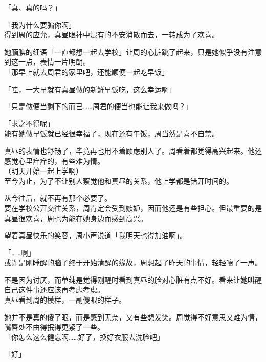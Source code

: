 「真、真的吗？」

「我为什么要骗你啊」\\

得到周的应允，真昼眼神中混有的不安消散而去，一转成为了欢喜。

她腼腆的细语「一直都想一起去学校」让周的心脏跳了起来，只是她似乎没有注意到这一点，表情一片明朗。\\

「那早上就去周君的家里吧，还能顺便一起吃早饭」

「哇，一大早就有真昼做的新鲜早饭吃，这么幸运啊」

「只是做便当剩下的而已……周君的便当也能让我来做吗？」

「求之不得呢」\\

能有她做早饭就已经很幸福了，现在还有午饭，周当然是喜不自禁。

真昼的表情也舒畅了，毕竟再也用不着顾虑别人了。周看着都觉得高兴起来。他还感觉心里痒痒的，有些难为情。\\

（明天开始一起上学啊）\\

至今为止，为了不让别人察觉他和真昼的关系，他上学都是错开时间的。

从今往后，就不再有那个必要了。\\

要在学校公开交往关系，周肯定会受到嫉妒，因而他还是有些担心。但最重要的是真昼很欢喜，周也为能在她身边而感到高兴。

望着真昼快乐的笑容，周小声说道「我明天也得加油啊」。\\

\vspace{2\baselineskip}

「……啊」\\

或许是刚睡醒的脑子终于开始清醒的缘故，周想起了昨天的事情，轻轻嚷了一声。

不是因为讨厌，而单纯是觉得刚醒时看到真昼的脸对心脏有点不好。看来让她叫醒自己这件事还应该再考虑考虑。\\

真昼看到周的模样，一副傻眼的样子。

她并不是真的傻了眼，而是感到无奈，又有些想发笑。周觉得不好意思又难为情，嘴唇处不由得抿得更紧了一些。\\

「你怎么这么健忘啊……好了，换好衣服去洗脸吧」

「好」\\

